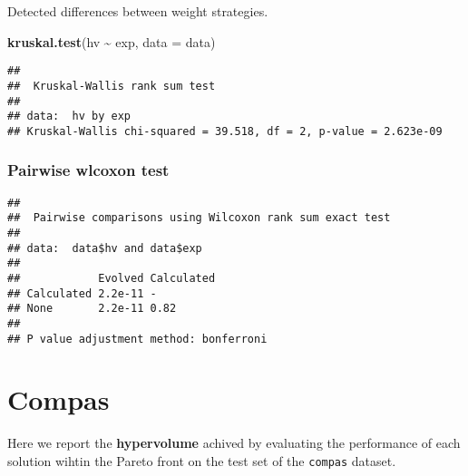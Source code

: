 \documentclass[
]{book}
\newenvironment{Shaded}{\begin{snugshade}}{\end{snugshade}}
\newcommand{\AttributeTok}[1]{\textcolor[rgb]{0.13,0.29,0.53}{#1}}
\newcommand{\ConstantTok}[1]{\textcolor[rgb]{0.56,0.35,0.01}{#1}}
\newcommand{\FunctionTok}[1]{\textcolor[rgb]{0.13,0.29,0.53}{\textbf{#1}}}
\newcommand{\NormalTok}[1]{#1}
\newcommand{\SpecialCharTok}[1]{\textcolor[rgb]{0.81,0.36,0.00}{\textbf{#1}}}
\newcommand{\StringTok}[1]{\textcolor[rgb]{0.31,0.60,0.02}{#1}}
\begin{document}
Detected differences between weight strategies.

\begin{Shaded}
\begin{Highlighting}[]
\FunctionTok{kruskal.test}\NormalTok{(hv }\SpecialCharTok{\textasciitilde{}}\NormalTok{ exp, }\AttributeTok{data =}\NormalTok{ data)}
\end{Highlighting}
\end{Shaded}

\begin{verbatim}
## 
##  Kruskal-Wallis rank sum test
## 
## data:  hv by exp
## Kruskal-Wallis chi-squared = 39.518, df = 2, p-value = 2.623e-09
\end{verbatim}

\hypertarget{pairwise-wlcoxon-test-7}{%
\subsection{Pairwise wlcoxon test}\label{pairwise-wlcoxon-test-7}}

\begin{Shaded}
\end{Shaded}

\begin{verbatim}
## 
##  Pairwise comparisons using Wilcoxon rank sum exact test 
## 
## data:  data$hv and data$exp 
## 
##            Evolved Calculated
## Calculated 2.2e-11 -         
## None       2.2e-11 0.82      
## 
## P value adjustment method: bonferroni
\end{verbatim}

\hypertarget{compas}{%
\chapter{Compas}\label{compas}}

Here we report the \textbf{hypervolume} achived by evaluating the performance of each solution wihtin the Pareto front on the test set of the \texttt{compas} dataset.
\end{document}
